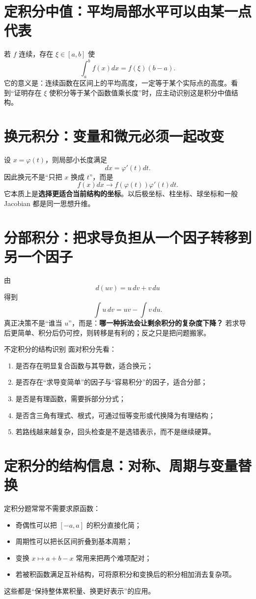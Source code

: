 \documentclass[11pt,a4paper,openany]{ctexbook}
\newcommand{\key}[1]{\textbf{\color{deep}#1}}
\begin{document}
\section{定积分中值：平均局部水平可以由某一点代表}
若 $f$ 连续，存在 $\xi\in[a,b]$ 使
\[
\int_a^b f(x)dx=f(\xi)(b-a).
\]
它的意义是：连续函数在区间上的平均高度，一定等于某个实际点的高度。看到“证明存在 $\xi$ 使积分等于某个函数值乘长度”时，应主动识别这是积分中值结构。

\section{换元积分：变量和微元必须一起改变}
设 $x=\varphi(t)$，则局部小长度满足
\[
dx=\varphi'(t)dt.
\]
因此换元不是“只把 $x$ 换成 $t$”，而是
\[
\boxed{f(x)dx\to f(\varphi(t))\varphi'(t)dt}.
\]
它本质上是\key{选择更适合当前结构的坐标}。以后极坐标、柱坐标、球坐标和一般 Jacobian 都是同一思想升维。

\section{分部积分：把求导负担从一个因子转移到另一个因子}
由
\[
d(uv)=u\,dv+v\,du
\]
得到
\[
\int u\,dv=uv-\int v\,du.
\]
真正决策不是“谁当 $u$”，而是：\key{哪一种拆法会让剩余积分的复杂度下降？} 若求导后更简单、积分后仍可控，则转移是有利的；反之只是把问题搬家。

\begin{methodbox}{不定积分的结构识别}
面对积分先看：
\begin{enumerate}
  \item 是否存在明显复合函数与其导数，适合换元；
  \item 是否存在“求导变简单”的因子与“容易积分”的因子，适合分部；
  \item 是否是有理函数，需要拆部分分式；
  \item 是否含三角有理式、根式，可通过恒等变形或代换降为有理结构；
  \item 若路线越来越复杂，回头检查是不是选错表示，而不是继续硬算。
\end{enumerate}
\end{methodbox}

\section{定积分的结构信息：对称、周期与变量替换}
定积分题常常不需要求原函数：
\begin{itemize}
  \item 奇偶性可以把 $[-a,a]$ 的积分直接化简；
  \item 周期性可以把长区间折叠到基本周期；
  \item 变换 $x\mapsto a+b-x$ 常用来把两个难项配对；
  \item 若被积函数满足互补结构，可将原积分和变换后的积分相加消去复杂项。
\end{itemize}
这些都是“保持整体累积量、换更好表示”的应用。
\end{document}
